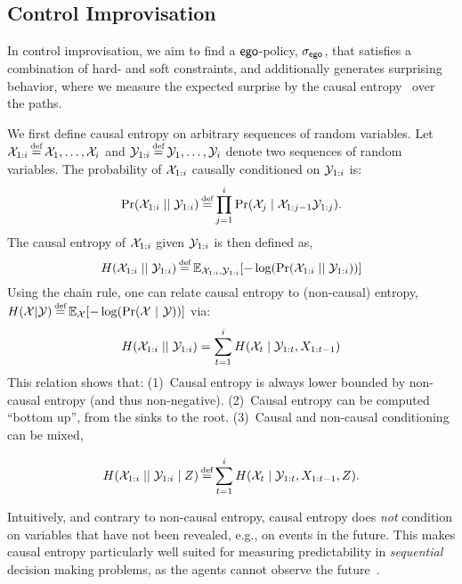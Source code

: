 {{{

\subsection{Control Improvisation}
In control improvisation, we aim to find a $\mathsf{ego}$-policy,
${\sigma_{\mathsf{ego}}}$, that satisfies a combination of hard- and soft
constraints, and additionally generates surprising behavior, where we
measure the expected surprise by the causal
entropy~\cite{DirectedInfoTheoery} over the paths.

We first define causal entropy on arbitrary sequences of random variables.
Let $\rv{X}_{1:i} \eqdef \rv{X}_1, \hdots, \rv{X}_i$ and $\rv{Y}_{1:i} \eqdef
\rv{Y}_1,\hdots,\rv{Y}_i$ denote two sequences of random variables. The
probability of $ {\mathcal{X}}_{1:i}$ causally conditioned on ${\mathcal{Y}}_{1:i}$ is:
\begin{equation}
  \causalprob{\rv{X}_{1:i}}{\rv{Y}_{1:i}} \eqdef \prod_{j=1}^i \Pr(\rv{X}_j \mid \rv{X}_{1:j-1}\rv{Y}_{1:j}).
\end{equation}
The causal entropy of ${\mathcal{X}}_{1:i}$ given ${\mathcal{Y}}_{1:i}$ is then defined as,
\begin{equation}
  H(\rv{X}_{1:i}\mid\mid \rv{Y}_{1:i}) \eqdef \expOver{\rv{X}_{1:i},\rv{Y}_{1:i}}{-\log(\causalprob{\rv{X}_{1:i}}{\rv{Y}_{1:i}})}
\end{equation}
Using the chain rule, one can relate causal entropy to (non-causal) entropy, $H(\rv{X} | \rv{Y}) \eqdef \expOver{\rv{X}}{-\log(\Pr(\rv{X}~|~\rv{Y}))}$ via:
\begin{equation}
  H({\mathcal{X}}_{1:i}\mid\mid {\mathcal{Y}}_{1:i}) = \sum_{t=1}^i H({\mathcal{X}}_t \mid {\mathcal{Y}}_{1:t}, X_{1:t-1})
\end{equation}
This relation shows that:
(1)~Causal entropy is always lower bounded by non-causal entropy (and
thus non-negative). 
(2)~Causal entropy can be computed ``bottom up'', from the sinks to the root.
(3)~Causal and non-causal conditioning can be mixed,

\vspace{-1.1em}
\begin{equation}
  H(\rv{X}_{1:i}\mid\mid \rv{Y}_{1:i} \mid Z) \eqdef \sum_{t=1}^i H(\rv{X}_t \mid \rv{Y}_{1:t}, X_{1:t-1}, Z).
\end{equation}
    
Intuitively, and contrary to non-causal entropy, causal entropy does \emph{not}
condition on variables that have not been revealed, e.g., on events in the future. 
This makes causal entropy particularly well suited for measuring
predictability in \emph{sequential} decision making problems, as the 
agents cannot observe the future~\cite{mceThesis}.

}}}

